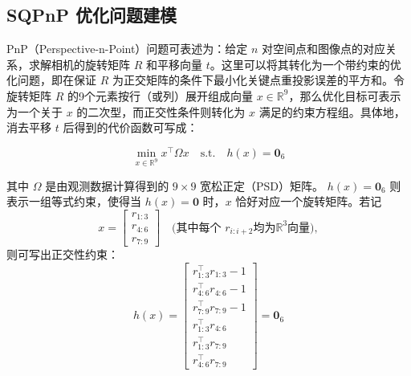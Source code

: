 \subsection{SQPnP 优化问题建模}
PnP（Perspective-n-Point）问题可表述为：给定 $n$ 对空间点和图像点的对应关系，求解相机的旋转矩阵 $R$ 和平移向量 $t$。这里可以将其转化为一个带约束的优化问题，即在保证 $R$ 为正交矩阵的条件下最小化关键点重投影误差的平方和。令旋转矩阵 $R$ 的9个元素按行（或列）展开组成向量 $x \in \mathbb{R}^9$，那么优化目标可表示为一个关于 $x$ 的二次型，而正交性条件则转化为 $x$ 满足的约束方程组。具体地，消去平移 $t$ 后得到的代价函数可写成：

\begin{equation}
	\min_{x \in \mathbb{R}^9}   x^\top \Omega x
	\quad \text{s.t.} \quad
	h(x) = \mathbf{0}_6
\end{equation}

其中 $\Omega$ 是由观测数据计算得到的 $9 \times 9$ 宽松正定（PSD）矩阵。  
$h(x) = \mathbf{0}_6$ 则表示一组等式约束，使得当 $h(x)=\mathbf{0}$ 时，$x$ 恰好对应一个旋转矩阵。若记
\begin{equation}
	x = 
	\begin{bmatrix}
		r_{1:3} \\[2pt]
		r_{4:6} \\[2pt]
		r_{7:9}
	\end{bmatrix}
	\quad\text{(其中每个 }r_{i:i+2}\text{均为}\mathbb{R}^3\text{向量)},
\end{equation}
则可写出正交性约束：
\begin{equation}
	h(x)  = 
	\begin{bmatrix}
		r_{1:3}^\top r_{1:3}  -  1 \\
		r_{4:6}^\top r_{4:6}  -  1 \\
		r_{7:9}^\top r_{7:9}  -  1 \\
		r_{1:3}^\top r_{4:6} \\
		r_{1:3}^\top r_{7:9} \\
		r_{4:6}^\top r_{7:9}
	\end{bmatrix}
	= 
	\mathbf{0}_6 
\end{equation}
